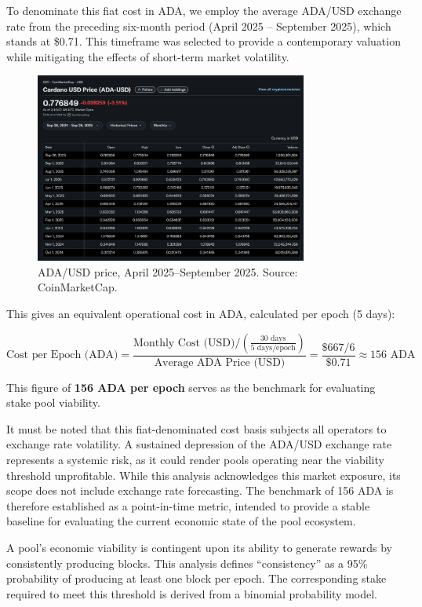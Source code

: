 \documentclass[11pt, letterpaper]{article}
\begin{document}
To denominate this fiat cost in ADA, we employ the average ADA/USD exchange
rate from the preceding six-month period (April 2025 – September 2025), which
stands at \$0.71. This timeframe was selected to provide a contemporary
valuation while mitigating the effects of short-term market volatility.

\begin{figure}[H]
	\centering
	\includegraphics[width=0.8\textwidth]{img/ada-usd.png}
	\caption{ADA/USD price, April 2025--September 2025. Source: CoinMarketCap.}\label{fig:ada-price}
\end{figure}

This gives an equivalent operational cost in ADA, calculated per epoch (5
days):

\[ \text{Cost per Epoch (ADA)} =
	\frac{\text{Monthly Cost (USD)} / (\frac{30\text{ days}}{5 \text{ days/epoch}})}{\text{Average ADA Price (USD)}}
	= \frac{\$667 / 6}{\$0.71} \approx 156\text{ ADA} \]

This figure of \textbf{156 ADA per epoch} serves as the benchmark for
evaluating stake pool viability.

It must be noted that this fiat-denominated cost basis subjects all operators
to exchange rate volatility. A sustained depression of the ADA/USD exchange
rate represents a systemic risk, as it could render pools operating near the
viability threshold unprofitable. While this analysis acknowledges this market
exposure, its scope does not include exchange rate forecasting. The benchmark
of 156 ADA is therefore established as a point-in-time metric, intended to
provide a stable baseline for evaluating the current economic state of the pool
ecosystem.

A pool's economic viability is contingent upon its ability to generate rewards
by consistently producing blocks. This analysis defines ``consistency'' as a
95\% probability of producing at least one block per epoch. The corresponding
stake required to meet this threshold is derived from a binomial probability
model.
\end{document}
